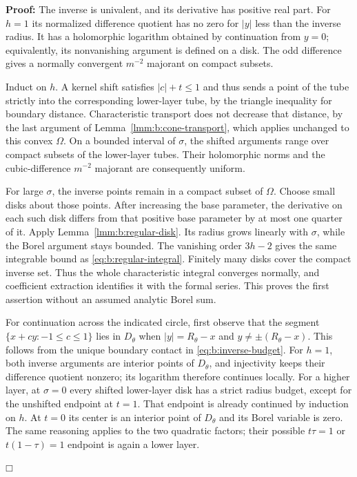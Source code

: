 \documentclass[a4paper,10pt]{article}
\numberwithin{equation}{section}
\theoremstyle{paperplain}
\theoremstyle{paperremark}
\theoremstyle{paperplain}
\newenvironment{prf}{\noindent \textbf{Proof: }}{\hfill $\mdlgwhtsquare$\par\addvspace{0.5\baselineskip}}
\begin{document}
\begin{prf}
The inverse is univalent, and its derivative has positive real part.
For $h=1$ its normalized difference quotient has no zero for
$|y|$ less than the inverse radius. It has a holomorphic logarithm
obtained by continuation from $y=0$; equivalently, its nonvanishing
argument is defined on a disk. The odd difference gives a normally
convergent $m^{-2}$ majorant on compact subsets.

Induct on $h$. A kernel shift satisfies $|c|+t\leq1$ and thus
sends a point of the tube strictly into the corresponding
lower-layer tube, by the triangle inequality for boundary distance.
Characteristic transport does not decrease that distance, by the
last argument of Lemma~\ref{lmm:b:cone-transport}, which applies
unchanged to this convex $\Omega$. On a bounded interval of
$\sigma$, the shifted arguments range over compact subsets of the
lower-layer tubes. Their holomorphic norms and the cubic-difference
$m^{-2}$ majorant are consequently uniform.

For large $\sigma$, the inverse points remain in a compact subset
of $\Omega$. Choose small disks about those points. After increasing
the base parameter, the derivative on each such disk differs from
that positive base parameter by at most one quarter of it. Apply
Lemma~\ref{lmm:b:regular-disk}. Its radius grows linearly with
$\sigma$, while the Borel argument stays bounded. The vanishing
order $3h-2$ gives the same integrable bound as
\eqref{eq:b:regular-integral}. Finitely many disks cover the compact
inverse set. Thus the whole characteristic integral converges
normally, and coefficient extraction identifies it with the formal
series. This proves the first assertion without an assumed analytic
Borel sum.

For continuation across the indicated circle, first observe that
the segment $\{x+c y:-1\leq c\leq1\}$ lies in $D_\theta$
when $|y|=R_\theta-x$ and $y\ne\pm(R_\theta-x)$.
This follows from the unique boundary contact in
\eqref{eq:b:inverse-budget}. For $h=1$, both inverse arguments
are interior points of $D_\theta$, and injectivity keeps their
difference quotient nonzero; its logarithm therefore continues
locally. For a higher layer, at $\sigma=0$ every shifted
lower-layer disk has a strict radius budget, except for the
unshifted endpoint at $t=1$. That endpoint is already continued
by induction on $h$. At $t=0$ its center is an interior point of
$D_\theta$ and its Borel variable is zero. The same reasoning
applies to the two quadratic factors; their possible $t\tau=1$
or $t(1-\tau)=1$ endpoint is again a lower layer.


\end{prf}
\end{document}

